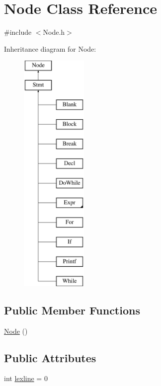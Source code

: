 \hypertarget{class_node}{}\section{Node Class Reference}
\label{class_node}


{\ttfamily \#include $<$Node.\+h$>$}

Inheritance diagram for Node\+:\begin{figure}[H]
\begin{center}
\leavevmode
\includegraphics[height=12.000000cm]{class_node}
\end{center}
\end{figure}
\subsection*{Public Member Functions}
\begin{DoxyCompactItemize}
\item 
\hyperlink{class_node_ad7a34779cad45d997bfd6d3d8043c75f}{Node} ()
\end{DoxyCompactItemize}
\subsection*{Public Attributes}
\begin{DoxyCompactItemize}
\item 
int \hyperlink{class_node_a8e50263ff9416be77e26edfbf6b926a1}{lexline} = 0
\end{DoxyCompactItemize}
